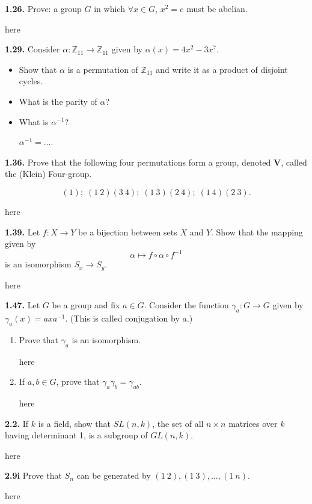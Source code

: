 \documentclass[12pt]{article}
\newcommand{\zee}{\mathbb{Z}}
\begin{document}
\textbf{1.26.} Prove: a group $G$ in which $\forall x\in G$, $x^2=e$ must be abelian.

\bigskip

here

\vspace{1in}

\textbf{1.29.} Consider $\alpha: \zee_{11}\to \zee_{11}$ given by $\alpha(x)=4x^2-3x^7$.
\begin{itemize}
	\item Show that $\alpha$ is a permutation of $\zee_{11}$ and write it as a product of disjoint cycles.
	
	\bigskip
	
	\item What is the parity of $\alpha$?
	
	\bigskip
	
	\item What is $\alpha^{-1}$?
	
	\bigskip
	
	$\alpha^{-1}=...$.
\end{itemize}


\textbf{1.36.} Prove that the following four permutations form a group, denoted $\mathbf{V}$, called the (Klein) Four-group.

\[(1);\; (1\ 2)(3\ 4);\; (1\ 3)(2\ 4);\; (1\ 4)(2\ 3).\]


\bigskip

here

\vspace{1in}


\textbf{1.39.} Let $f : X\to Y$ be a bijection between sets $X$ and $Y$. Show that the mapping given by \[\alpha \mapsto f\circ\alpha\circ f^{-1}\] is an isomorphism $S_x\to S_y$.


\bigskip

here

\vspace{1in}

\textbf{1.47.} Let $G$ be a group and fix $a\in G$. Consider the function $\gamma_a: G\to G$ given by $\gamma_a(x)=axa^{-1}$. (This is called conjugation by $a$.)
\begin{enumerate}[(i.)]
	\item Prove that $\gamma_a$ is an isomorphism.
	
	\bigskip

here

\vspace{1in}

	\item If $a,b\in G$, prove that $\gamma_a\gamma_b=\gamma_{ab}$.
	
	\bigskip

here

\vspace{1in}
\end{enumerate}



\textbf{2.2.} If $k$ is a field, show that $SL(n,k)$, the set of all $n\times n$ matrices over $k$ having determinant 1, is a subgroup of $GL(n,k)$. 

\bigskip

here

\vspace{1in}

\textbf{2.9i} Prove that $S_n$ can be generated by $(1\ 2), (1\ 3),\dotsc, (1\ n).$

\bigskip

here

\vspace{1in}
\end{document}
